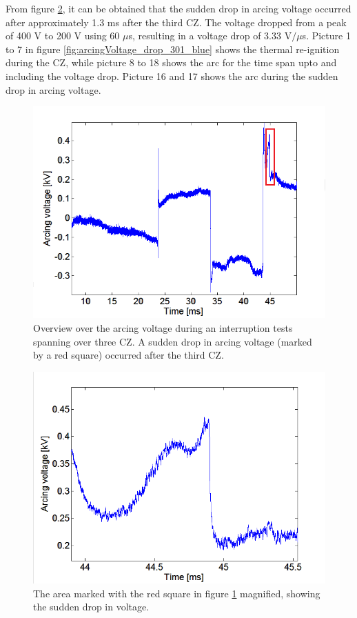 \documentclass[10pt,b5paper,twoside]{article}
\begin{document}
From figure \ref{fig:arcingVoltageDrop_zoomed}, it can be obtained that the sudden drop in arcing voltage occurred after approximately 1.3 ms after the third CZ. The voltage dropped from a peak of 400 V to 200 V using 60 $\mu$s, resulting in a voltage drop of 3.33 V$/  \mu$s. Picture 1 to 7 in figure \ref{fig:arcingVoltage_drop_301_blue} shows the thermal re-ignition during the CZ, while picture 8 to 18 shows the arc for the time span upto and including the voltage drop. Picture 16 and 17 shows the arc during the sudden drop in arcing voltage. 

 

\begin{figure}[H]
\centering
\includegraphics[scale=0.6, angle =0 ]{Bilder/Results/overviewArcingVoltageDrop.PNG}
\caption{Overview over the arcing voltage during an interruption tests spanning over three CZ. A sudden drop in arcing voltage (marked by a red square) occurred after the third CZ.} \label{fig:arcingVoltageDrop}
\end{figure}

\begin{figure}[H]
\centering
\includegraphics[scale=0.6, angle =0 ]{Bilder/Results/zoomArcingVoltageDrop.PNG}
\caption{The area marked with the red square in figure \ref{fig:arcingVoltageDrop} magnified, showing the sudden drop in voltage.} \label{fig:arcingVoltageDrop_zoomed}
\end{figure}
\end{document}
